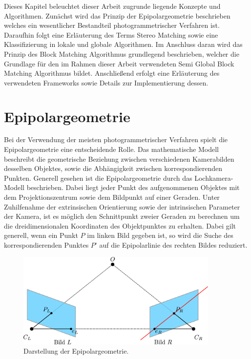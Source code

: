 Dieses Kapitel beleuchtet dieser Arbeit zugrunde liegende Konzepte und Algorithmen. Zunächst wird das Prinzip der Epipolargeometrie beschrieben welches ein wesentlicher Bestandteil photogrammetrischer Verfahren ist. Daraufhin folgt eine Erläuterung des Terms Stereo Matching sowie eine Klassifizierung in lokale und globale Algorithmen. Im Anschluss daran wird das Prinzip des Block Matching Algorithmus grundlegend beschrieben, welcher die Grundlage für den im Rahmen dieser Arbeit verwendeten Semi Global Block Matching Algorithmus bildet. Anschließend erfolgt eine Erläuterung des verwendeten Frameworks sowie Details zur Implementierung dessen.

\section{Epipolargeometrie}
\label{sec:epipolargeometrie}
Bei der Verwendung der meisten photogrammetrischer Verfahren spielt die Epipolargeometrie eine entscheidende Rolle. Das mathematische Modell beschreibt die geometrische Beziehung zwischen verschiedenen Kamerabilden desselben Objektes, sowie die Abhängigkeit zwischen korrespondierenden Punkten. Generell gesehen ist die Epipolargeometrie durch das Lochkamera-Modell beschrieben. Dabei liegt jeder Punkt des aufgenommenen Objektes mit dem Projektionszentrum sowie dem Bildpunkt auf einer Geraden. Unter Zuhilfenahme der extrinsischen Orientierung sowie der intrinsischen Parameter der Kamera, ist es möglich den Schnittpunkt zweier Geraden zu berechnen um die dreidimensionalen Koordinaten des Objektpunktes zu erhalten. Dabei gilt generell, wenn ein Punkt $P$ im linken Bild gegeben ist, so wird die Suche des korrespondierenden Punktes $P’$ auf die Epipolarlinie des rechten Bildes reduziert. 

\begin{figure}
	\begin{center}
		\includegraphics[width=10cm]{img/epipolar_geometry.pdf}
	\end{center}
	\caption{Darstellung der Epipolargeometrie.}
	\label{fig:epipolar_geometry}
\end{figure}

